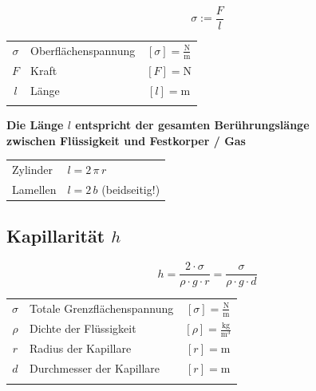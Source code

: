 $$ \boxed{ \sigma := \frac{F}{l} } $$ 


	\begin{tabular}{c l c}
		\rule{0pt}{10pt}$\sigma$ & Oberflächenspannung & $[\sigma] = \mathrm{\frac{N}{m}}$ \\
		$F$ & Kraft & $[F] = \mathrm{N} $ \\
		$l$ & Länge & $[l] = \mathrm{m}$  \\
		\\
	\end{tabular}
	
	\textbf{Die Länge $l$ entspricht der gesamten Berührungslänge  \\
	zwischen Flüssigkeit und Festkorper / Gas} \\
	
	\begin{tabular}{ll}
	Zylinder & $l = 2 \, \pi \, r$ \\
	Lamellen & $l = 2 \, b$  (beidseitig!) \\
	\end{tabular}





\subsection{Kapillarität $h$}

$$\boxed{  h = \frac{2 \cdot \sigma}{\rho \cdot g \cdot r} = \frac{\sigma}{\rho \cdot g \cdot d} }$$ 


	\begin{tabular}{c l c}
		\rule{0pt}{10pt}$\sigma$ & Totale Grenzflächenspannung & $[\sigma] = \mathrm{\frac{N}{m}}$ \\
		\rule{0pt}{10pt}$\rho$ & Dichte der Flüssigkeit & $[\rho] = \mathrm{\frac{kg}{m^3}} $ \\
		\rule{0pt}{10pt}$r$ & Radius der Kapillare & $[r] = \mathrm{m}$  \\
		$d$ & Durchmesser der Kapillare & $[r] = \mathrm{m}$  \\
		\\
	\end{tabular}

